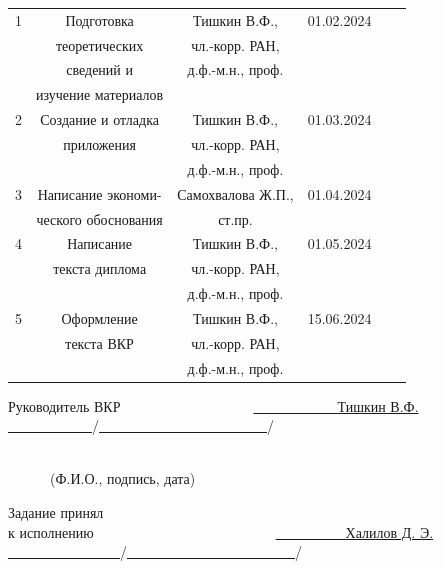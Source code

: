 \documentclass[a4paper,14pt,russian]{extreport}
\renewcommand{\_}{\kern-1.5pt\textunderscore\kern-1.5pt}
\begin{document}
\begin{flushleft}
\begin{table}[ht]
\begin{tabular}{|c|c|c|c|c|c|}
        
        \small{1}  & \small{Подготовка}  & \small{Тишкин В.Ф., }& \small{01.02.2024} & & \\ 
        & \small{теоретических} &  \small{чл.-корр. РАН,} & & & \\
        & \small{сведений и } & \small{ д.ф.-м.н., проф.} &  & & \\  
        & \small{изучение материалов} &  &  & & \\
        \hline  
        
        \small{2}  & \small{Создание и отладка} & \small{Тишкин В.Ф., } & \small{01.03.2024} & & \\ 
        &  \small{приложения} & \small{чл.-корр. РАН,} &  & & \\
        & & \small{д.ф.-м.н., проф.} & & & \\ \hline

        \small{3}  & \small{Написание экономи-} & \small{Самохвалова Ж.П.,}  & \small{01.04.2024}  & & \\ 
        & \small{ческого обоснования} &\small{ ст.пр. } &  & & \\ \hline  

        \small{4}  & \small{Написание} & \small{Тишкин В.Ф., } & \small{01.05.2024} & & \\ 
        & \small{текста диплома} & \small{чл.-корр. РАН,} & & & \\
        & & \small{д.ф.-м.н., проф.} & & & \\ \hline
        
        \small{5}  & \small{Оформление} & \small{Тишкин В.Ф., }&\small{ 15.06.2024} & & \\
        & \small{текста ВКР} &\small{чл.-корр. РАН,} & & & \\
        & & \small{д.ф.-м.н., проф.}& & & \\
        \hline
    \end{tabular}
\end{table}

		\begin{small}
			Руководитель ВКР\ \ \ \ \ \ \ \ \ \ \ \ \ \ \ \ \ \ \ \uline{\ \ \ \ \ \ \ \ \ \ \ \ Тишкин В.Ф. \ \ \ \ \ \ \ \ \ \ \ \  }/\uline{\ \ \ \ \ \ \ \ \ \ \ \ \ \ \ \ \ \ \ \ \ \ \ \  }/\par
			
			{\fontsize{10pt}{12.0pt}\selectfont \ \ \ \ \ \ \ \ \ \ \ \ \ \ \ \ \ \ \ \ \ \ \ \ \ \ \ \ \ \ \ \ \ \ \ \ \ \ \ \ \ \ \ \ \ \ \ \ \ \ \ \ \ \ \ \ \ \ \ \ \ \ \ \ \ \ \ \ \ \ \ \ \ \ \ \ \ \  (Ф.И.О., подпись, дата)\par}
			Задание принял\\
			к исполнению\ \ \ \ \  \ \ \ \ \ \ \ \ \ \ \ \ \ \ \ \ \ \ \ \ \  \uline{\ \ \ \  \ \ \ \ \  \ Халилов Д. Э. \ \ \ \ \ \ \ \ \ \ \ \ \ \ \ \  }/\uline{\ \ \ \ \ \ \ \ \ \ \ \ \ \ \ \ \ \ \ \ \ \ \ \  }/\par
			

\end{small}
\end{flushleft}
\end{document}
